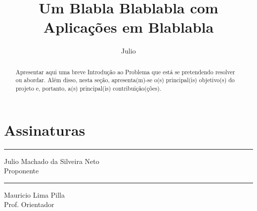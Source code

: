 \documentclass[diss-proposta,nocipinfo]{texufpel}
\title{Um Blabla Blablabla com Aplicações em Blablabla}
\author{Julio}{Silveira Neto}
\begin{document}

\maketitle 

\begin{abstract}
  Apresentar aqui uma breve Introdução ao Problema que está se
  pretendendo resolver ou abordar. Além disso, nesta seção,
  apresenta(m)-se o(s) principal(is) objetivo(s) do projeto e,
  portanto, a(s) principal(is) contribuição(ções).
\end{abstract}














\chapter{Assinaturas}
\vspace{2cm}

\begin{center}
\rule{8cm}{.3mm}
\medskip

	Julio Machado da Silveira Neto\\
	Proponente

\end{center}

\vspace{4cm}

\begin{center}
\rule{8cm}{.3mm}
\medskip

	Mauricio Lima Pilla\\
	Prof. Orientador

\end{center}
\end{document}

